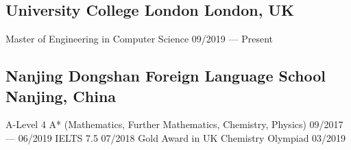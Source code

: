 
\subsection{University College London \hfill London, UK}
    Master of Engineering in Computer Science \hfill 09/2019 --- Present 
    \newline

\subsection{Nanjing Dongshan Foreign Language School \hfill Nanjing, China}
    A-Level 4 A* (Mathematics, Further Mathematics, Chemistry, Physics) 
        \hfill 09/2017 --- 06/2019 
    \newline
    IELTS 7.5 
        \hfill 07/2018 
    \newline
    Gold Award in UK Chemistry Olympiad
        \hfill 03/2019


